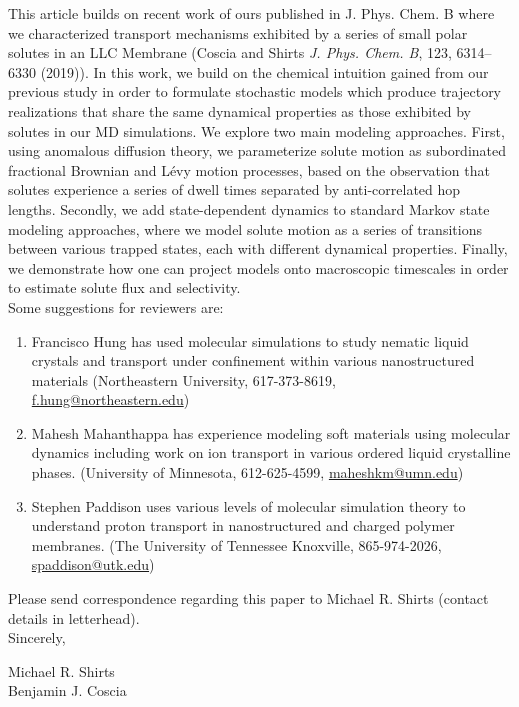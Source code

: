 \documentclass[fontsize=11pt]{article}
\begin{document}
	This article builds on recent work of ours published in
        J. Phys. Chem. B where we characterized transport mechanisms
        exhibited by a series of small polar solutes in an LLC
        Membrane (Coscia and Shirts \textit{J. Phys.  Chem. B}, 123,
        6314--6330 (2019)). In this work, we build on the chemical
        intuition gained from our previous study in order to formulate
        stochastic models which produce trajectory realizations that
        share the same dynamical properties as those exhibited by
        solutes in our MD simulations. We explore two main modeling
        approaches. First, using anomalous diffusion theory, we
        parameterize solute motion as subordinated fractional Brownian
        and L\'evy motion processes, based on the observation that
        solutes experience a series of dwell times separated by
        anti-correlated hop lengths. Secondly, we add state-dependent
        dynamics to standard Markov state modeling approaches, where
        we model solute motion as a series of transitions between
        various trapped states, each with different dynamical
        properties.  Finally, we demonstrate how one can project models 
        onto macroscopic timescales in order to estimate
        solute flux and selectivity.\\
	
	\noindent Some suggestions for reviewers are:
	\begin{enumerate}
	
		\item Francisco Hung has used molecular simulations to study nematic liquid crystals
		and transport under confinement within various nanostructured materials 
		(Northeastern University, 617-373-8619,\\ \href{mailto:f.hung@northeastern.edu}{f.hung@northeastern.edu})
		
		\item Mahesh Mahanthappa has experience modeling soft materials using molecular dynamics
		including work on ion transport in various ordered liquid crystalline phases. 
		(University of Minnesota, 612-625-4599, \href{mailto:maheshkm@umn.edu}{maheshkm@umn.edu})
		
		\item Stephen Paddison uses various levels of molecular simulation theory to understand
		proton transport in nanostructured and charged polymer membranes. (The University of Tennessee 
		Knoxville, 865-974-2026, \href{mailto:spaddison@utk.edu}{spaddison@utk.edu})
		
	\end{enumerate}
	
	\noindent Please send correspondence regarding this paper to Michael R. Shirts (contact
	details in letterhead).\\	
	
	\noindent Sincerely,
	
	\noindent Michael R. Shirts \\
	\noindent Benjamin J. Coscia \\
	
\end{document}
